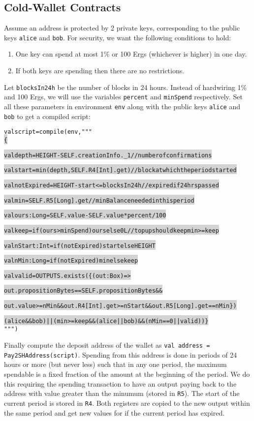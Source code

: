 \documentclass[11pt]{article}
\newcommand\Hi[2][lightgray]{%
	\hspace*{-\fboxsep}%
	\colorbox{#1}{#2}%
	\hspace*{-\fboxsep}%
}
\begin{document}
\subsection{Cold-Wallet Contracts}

Assume an address is protected by 2 private keys, corresponding to the public keys \texttt{alice} and \texttt{bob}. For security, we want the following conditions to hold:

\begin{enumerate}
	\item One key can spend at most 1\% or 100 Ergs (whichever is higher) in one day.
	\item If both keys are spending then there are no restrictions. 
\end{enumerate}

Let \texttt{blocksIn24h} be the number of blocks in 24 hours. Instead of hardwiring 1\% and 100 Ergs, we will use the variables \texttt{percent} and \texttt{minSpend} respectively. Set all these parameters in environment \texttt{env} along with the public keys \texttt{alice} and \texttt{bob} to get a compiled script:
\begin{alltt}
val script = compile(env, """ \Hi{\{}
  \Hi{val depth = HEIGHT - SELF.creationInfo._1 // number of confirmations}
  \Hi{val start = min(depth, SELF.R4[Int].get) // block at which the period started}
  \Hi{val notExpired = HEIGHT - start <= blocksIn24h // expired if 24 hrs passed}  
  \Hi{val min = SELF.R5[Long].get // min Balance needed in this period}

  \Hi{val ours:Long = SELF.value - SELF.value * percent / 100}
  \Hi{val keep = if (ours > minSpend) ours else 0L // topup should keep min >= keep}  
  \Hi{val nStart:Int = if (notExpired) start else HEIGHT}
  \Hi{val nMin:Long = if (notExpired) min else keep}
  
  \Hi{val valid = OUTPUTS.exists(\{(out:Box) =>}
    \Hi{out.propositionBytes == SELF.propositionBytes &&}
    \Hi{out.value >= nMin && out.R4[Int].get >= nStart && out.R5[Long].get == nMin\})}
    
  \Hi{(alice && bob) || (min >= keep && (alice || bob) && (nMin == 0 || valid))\}} """)

\end{alltt}
 
Finally compute the deposit address of the wallet as \texttt{val address = Pay2SHAddress(script)}. %
Spending from this address is done in periods of 24 hours or more (but never less) such that in any one period, the maximum spendable is a fixed fraction of the amount at the beginning of the period. We do this requiring the spending transaction to have an output paying back to the address with value greater than the minumum (stored in \texttt{R5}). The start of the current period is stored in \texttt{R4}. Both registers are copied to the new output within the same period and get new values for if the current period has expired.
\end{document}
